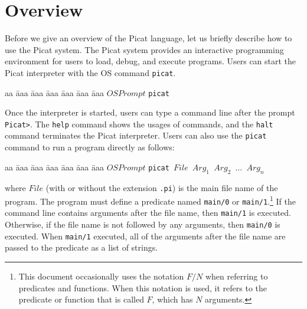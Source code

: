 \chapter{\label{chapter:overview}Overview}
Before we give an overview of the Picat language, let us briefly describe how to use the Picat system. The Picat system provides an interactive programming environment for users to load, debug, and execute programs. Users can start the Picat interpreter with the OS command \texttt{picat}.
\begin{tabbing}
aa \= aaa \= aaa \= aaa \= aaa \= aaa \= aaa \kill
\> \> $OSPrompt$ \texttt{picat}
\end{tabbing}
Once the interpreter is started, users can type a command line after the prompt \verb+Picat>+. The \texttt{help} command shows the usages of commands, and the \texttt{halt} command terminates the Picat interpreter. Users can also use the \texttt{picat} command to run a program directly as follows:
\begin{tabbing}
aa \= aaa \= aaa \= aaa \= aaa \= aaa \= aaa \kill
\> \> $OSPrompt$ \texttt{picat $File$ $Arg_1$ $Arg_2$ $\ldots$ $Arg_n$}
\end{tabbing}
where $File$ (with or without the extension \texttt{.pi}) is the main file name of the program. The program must define a predicate named \texttt{main/0} or \texttt{main/1}.\footnote{This document occasionally uses the notation $F/N$ when referring to predicates and functions.  When this notation is used, it refers to the predicate or function that is called $F$, which has $N$ arguments.} If the command line contains arguments after the file name, then \texttt{main/1} is executed. Otherwise, if the file name is not followed by any arguments, then \texttt{main/0} is executed. When \texttt{main/1} executed, all of the arguments after the file name are passed to the predicate as a list of strings.


